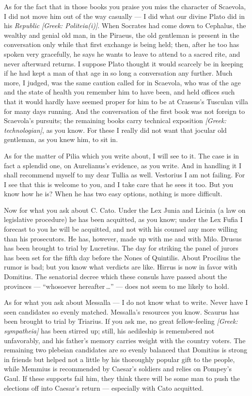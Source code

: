  As for the fact that in those books you praise you miss the character of Scaevola, I did not move him out of the way casually --- I did what our divine Plato did in his \textit{Republic} \textit{[Greek: Politeia(i)]}. When Socrates had come down to Cephalus, the wealthy and genial old man, in the Piraeus, the old gentleman is present in the conversation only while that first exchange is being held; then, after he too has spoken very gracefully, he says he wants to leave to attend to a sacred rite, and never afterward returns. I suppose Plato thought it would scarcely be in keeping if he had kept a man of that age in so long a conversation any further. Much more, I judged, was the same caution called for in Scaevola, who was of the age and the state of health you remember him to have been, and held offices such that it would hardly have seemed proper for him to be at Crassus's Tusculan villa for many days running. And the conversation of the first book was not foreign to Scaevola's pursuits; the remaining books carry technical exposition \textit{[Greek: technologian]}, as you know. For these I really did not want that jocular old gentleman, as you knew him, to sit in.

 As for the matter of Pilia which you write about, I will see to it. The case is in fact a splendid one, on Aurelianus's evidence, as you write. And in handling it I shall recommend myself to my dear Tullia as well. Vestorius I am not failing. For I see that this is welcome to you, and I take care that he sees it too. But you know how he is? When he has two easy options, nothing is more difficult.

 Now for what you ask about C. Cato. Under the Lex Junia and Licinia (a law on legislative procedure) he has been acquitted, as you know; under the Lex Fufia I forecast to you he will be acquitted, and not with his counsel any more willing than his prosecutors. He has, however, made up with me and with Milo. Drusus has been brought to trial by Lucretius. The day for striking the panel of jurors has been set for the fifth day before the Nones of Quintilis. About Procilius the rumor is bad; but you know what verdicts are like. Hirrus is now in favor with Domitius. The senatorial decree which these consuls have passed about the provinces --- ``whosoever hereafter\,\dots'' --- does not seem to me likely to hold.

 As for what you ask about Messalla --- I do not know what to write. Never have I seen candidates so evenly matched. Messalla's resources you know. Scaurus has been brought to trial by Triarius. If you ask me, no great fellow-feeling \textit{[Greek: sympatheia]} has been stirred up; still, his aedileship is remembered not unfavorably, and his father's memory carries weight with the country voters. The remaining two plebeian candidates are so evenly balanced that Domitius is strong in friends but helped not a little by his thoroughly popular gift to the people, while Memmius is recommended by Caesar's soldiers and relies on Pompey's Gaul. If these supports fail him, they think there will be some man to push the elections off into Caesar's return --- especially with Cato acquitted.

